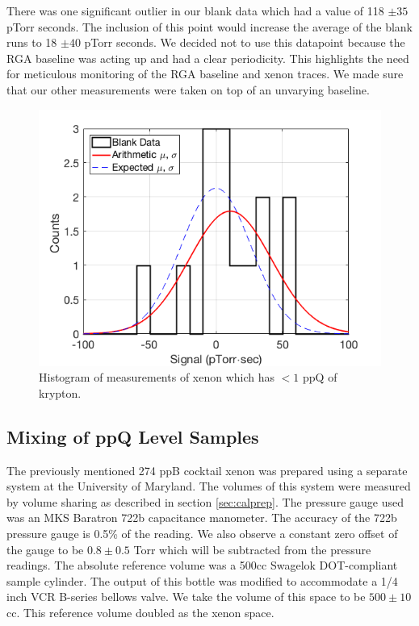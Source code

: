 There was one significant outlier in our blank data which had a value of 118 $\pm35$ pTorr seconds. The inclusion of this point would increase the average of the blank runs to 18 $\pm40$ pTorr seconds. We decided not to use this datapoint because the RGA baseline was acting up and had a clear periodicity. This highlights the need for meticulous monitoring of the RGA baseline and xenon traces. We made sure that our other measurements were taken on top of an unvarying baseline.
\begin{figure}[h!]
  \includegraphics[width=\linewidth]{Figures/BlankHist0217.png}
  \caption{Histogram of measurements of xenon which has $<1$ ppQ of  krypton.}
  \label{fig:senstrace}
\end{figure}


\subsection{Mixing of ppQ Level Samples}\label{sec:ppqprep}
The previously mentioned 274 ppB cocktail xenon was prepared using a separate system at the University of Maryland. The volumes of this system were measured by volume sharing as described in section \ref{sec:calprep}. The pressure gauge used was an MKS Baratron 722b capacitance manometer. The accuracy of the 722b pressure gauge is 0.5\% of the reading. We also observe a constant zero offset of the gauge to be $0.8\pm0.5$ Torr which will be subtracted from the pressure readings. The absolute reference volume was a 500cc Swagelok DOT-compliant sample cylinder. The output of this bottle was modified to accommodate a 1/4 inch VCR B-series bellows valve. We take the volume of this space to be $500 \pm10$cc. This reference volume doubled as the xenon space. 

